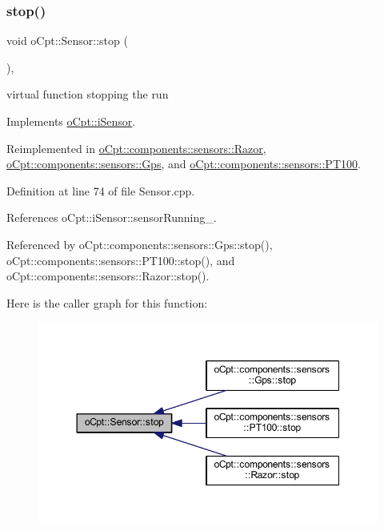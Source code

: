 \subsubsection{\texorpdfstring{stop()}{stop()}}
{\footnotesize\ttfamily void o\+Cpt\+::\+Sensor\+::stop (\begin{DoxyParamCaption}{ }\end{DoxyParamCaption})\hspace{0.3cm}{\ttfamily [override]}, {\ttfamily [virtual]}}

virtual function stopping the run 

Implements \hyperlink{classo_cpt_1_1i_sensor_aa85c22a8c8f7c2445379e1f82835f8dc}{o\+Cpt\+::i\+Sensor}.



Reimplemented in \hyperlink{classo_cpt_1_1components_1_1sensors_1_1_razor_a807441c137892ee3c1b612c284893fa1}{o\+Cpt\+::components\+::sensors\+::\+Razor}, \hyperlink{classo_cpt_1_1components_1_1sensors_1_1_gps_a9206c32fa91311740ae920c01eed6094}{o\+Cpt\+::components\+::sensors\+::\+Gps}, and \hyperlink{classo_cpt_1_1components_1_1sensors_1_1_p_t100_a6d80e18a58cf4e1b9b6ce82b441209e2}{o\+Cpt\+::components\+::sensors\+::\+P\+T100}.



Definition at line 74 of file Sensor.\+cpp.



References o\+Cpt\+::i\+Sensor\+::sensor\+Running\+\_\+.



Referenced by o\+Cpt\+::components\+::sensors\+::\+Gps\+::stop(), o\+Cpt\+::components\+::sensors\+::\+P\+T100\+::stop(), and o\+Cpt\+::components\+::sensors\+::\+Razor\+::stop().

Here is the caller graph for this function\+:\nopagebreak
\begin{figure}[H]
\begin{center}
\leavevmode
\includegraphics[width=350pt]{classo_cpt_1_1_sensor_a44ad78c2c091ca9cf72295293f8c5b74_icgraph}
\end{center}
\end{figure}
\hypertarget{classo_cpt_1_1_sensor_ab4b0dedb06f11bcf2368852035beb2b2}{}\label{classo_cpt_1_1_sensor_ab4b0dedb06f11bcf2368852035beb2b2} 
